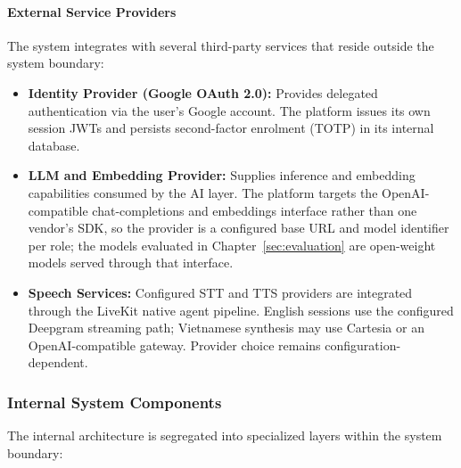 \paragraph{External Service Providers}
The system integrates with several third-party services that reside outside the system boundary:

\begin{itemize}
    \item \textbf{Identity Provider (Google OAuth 2.0):} Provides delegated authentication via the user's Google account. The platform issues its own session JWTs and persists second-factor enrolment (TOTP) in its internal database.
    \item \textbf{LLM and Embedding Provider:} Supplies inference and embedding capabilities consumed by the AI layer. The platform targets the OpenAI-compatible chat-completions and embeddings interface rather than one vendor's SDK, so the provider is a configured base URL and model identifier per role; the models evaluated in Chapter~\ref{sec:evaluation} are open-weight models served through that interface.
    \item \textbf{Speech Services:} Configured STT and TTS providers are integrated through the LiveKit native agent pipeline. English sessions use the configured Deepgram streaming path; Vietnamese synthesis may use Cartesia or an OpenAI-compatible gateway. Provider choice remains configuration-dependent.
\end{itemize}

\subsubsection{Internal System Components}
The internal architecture is segregated into specialized layers within the system boundary:


